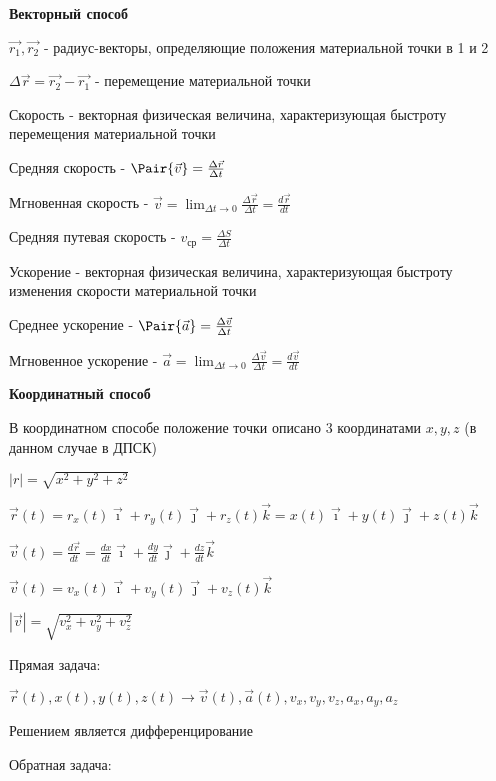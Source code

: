 \documentclass[12pt]{article}
\begin{document}
    \textbf{Векторный способ}

    $\vec{r_1}, \vec{r_2}$ - радиус-векторы, определяющие положения материальной точки в 1 и 2

    $\Delta \vec{r} = \vec{r_2} - \vec{r_1}$ - перемещение материальной точки

    \Def Скорость - векторная физическая величина, характеризующая быстроту перемещения материальной точки

    Средняя скорость - $\Pair{\vec{v}} = \frac{\Delta \vec{r}}{\Delta t}$

    Мгновенная скорость - $\vec{v} = \lim_{\Delta t \to 0} \frac{\Delta \vec{r}}{\Delta t} = \frac{d \vec{r}}{dt}$

    Средняя путевая скорость - $v_{\text{ср}} = \frac{\Delta S}{\Delta t}$

    \Def Ускорение - векторная физическая величина, характеризующая быстроту изменения скорости материальной точки

    Среднее ускорение - $\Pair{\vec{a}} = \frac{\Delta \vec{v}}{\Delta t}$

    Мгновенное ускорение - $\vec{a} = \lim_{\Delta t \to 0} \frac{\Delta \vec{v}}{\Delta t} = \frac{d \vec{v}}{dt}$


    \textbf{Координатный способ}

    В координатном способе положение точки описано 3 координатами $x, y, z$ (в данном случае в ДПСК)

    $|r| = \sqrt{x^2 + y^2 + z^2}$

    $\vec{r} (t) = r_x (t) \vec{\imath} + r_y (t) \vec{\jmath} + r_z (t) \vec{k} = x(t) \vec{\imath} + y(t) \vec{\jmath} + z(t) \vec{k}$

    $\vec{v} (t) = \frac{d \vec{r}}{dt} = \frac{dx}{dt} \vec{\imath} + \frac{dy}{dt} \vec{\jmath} + \frac{dz}{dt} \vec{k}$

    $\vec{v} (t) = v_x(t)\vec{\imath} + v_y(t) \vec{\jmath} + v_z(t) \vec{k}$

    $|\vec{v}| = \sqrt{v_x^2 + v_y^2 + v_z^2}$



    Прямая задача:

    $\vec{r}(t), x(t), y(t), z(t) \longrightarrow \vec{v}(t), \vec{a}(t), v_x, v_y, v_z, a_x, a_y, a_z$

    Решением является дифференцирование

    Обратная задача:
\end{document}

